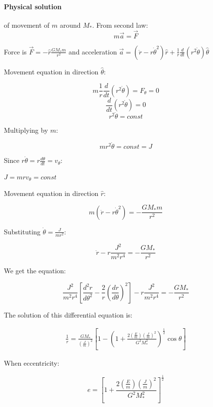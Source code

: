 \paragraph{Physical solution} of movement of $m$ around $M_*$.
From second law:
$$m\vec{a} = \vec{F}$$

Force is $\vec{F}  =-\hat{r}\frac{GM_*m}{r^2}$ and acceleration $\vec{a} = \left( \ddot{r} - r\dot{\theta}^2 \right)\hat{r} + \frac{1}{r}\frac{d}{dt}\left( r^2\dot{\theta} \right)\hat{\theta}$

Movement equation in direction $\hat{\theta}$:

$$m\frac{1}{r}\frac{d}{dt}\left( r^2 \dot{\theta} \right) = F_\theta = 0$$
$$\frac{d}{dt}\left( r^2 \dot{\theta} \right) = 0$$
$$r^2 \dot{\theta} = const$$

Multiplying by $m$:

$$mr^2 \dot{\theta} = const  =J$$

Since $r\dot{\theta} = r \frac{d\theta}{dt} = v_\theta$:

$J=mrv_\theta=const$

Movement equation in direction $\hat{r}$:

$$m\left( \ddot{r} - r\dot{\theta}^2 \right) = -\frac{GM_*m}{r^2}$$

Substituting $\dot{\theta} = \frac{J}{mr^2}$:

$$\ddot{r} - r\frac{J^2}{m^2r^4} = -\frac{GM_*}{r^2}$$

We get the equation:

$$\frac{J^2}{m^2r^4}\left[ \frac{d^2r}{d\theta^2} - \frac{2}{r}\left( \frac{dr}{d\theta} \right)^2 \right] - r\frac{J^2}{m^2r^4} = -\frac{GM_*}{r^2}$$

The solution of this differential equation is:

\begin{align*}
\frac{1}{r} = \frac{GM_*}{\left( \frac{J}{m} \right)^2} \left[ 1 - \left( 1+ \frac{2\left( \frac{E}{m} \right)\left( \frac{J}{m} \right)^2}{G^2M_*^2} \right)^{\frac{1}{2}}  \cos \theta \right]
\end{align*}

When eccentricity:

$$e=\left[ 1+ \frac{2\left( \frac{E}{m} \right)\left( \frac{J}{m} \right)^2}{G^2M_*^2} \right]^{\frac{1}{2}}$$ 